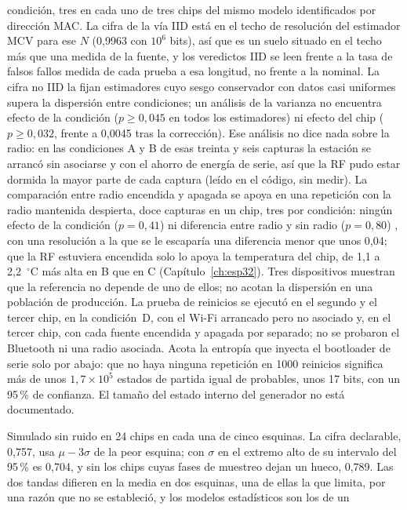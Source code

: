 \begin{description}
condición, tres en cada uno de tres chips del mismo modelo identificados por dirección
MAC. La
cifra de la vía IID está en el techo de resolución del estimador MCV para
ese $N$ (0,9963 con $10^6$ bits), así que es un suelo situado en el techo
más que una medida de la fuente, y los veredictos IID se leen frente a la
tasa de falsos fallos medida de cada prueba a esa longitud, no frente a la
nominal. La cifra no IID la fijan estimadores cuyo sesgo conservador con
datos casi uniformes supera la dispersión entre condiciones; un análisis
de la varianza no encuentra efecto de la condición ($p \ge 0{,}045$ en
todos los estimadores) ni efecto del chip ($p \ge 0{,}032$, frente a
0,0045 tras la corrección). Ese análisis no dice nada sobre la radio: en
las condiciones A y B de esas treinta y seis capturas la estación se
arrancó sin asociarse y con el ahorro de energía de serie, así que la RF
pudo estar dormida la mayor parte de cada captura (leído en el código,
sin medir). La comparación entre radio encendida y apagada se apoya en
una repetición con la radio mantenida despierta, doce capturas en un
chip, tres por condición: ningún efecto de la condición ($p = 0{,}41$)
ni diferencia entre radio y sin radio ($p = 0{,}80$) \meas{}, con una
resolución a la que se le escaparía una diferencia menor que unos 0,04;
que la RF estuviera encendida solo lo apoya la temperatura del chip, de
1,1 a 2,2~$^\circ$C más alta en B que en C (Capítulo~\ref{ch:esp32}).
Tres dispositivos muestran que la referencia
no depende de uno de ellos; no acotan la dispersión en una población de
producción. La prueba de reinicios se ejecutó en el segundo y el tercer
chip, en la
condición~D, con el Wi-Fi arrancado pero no asociado y, en el tercer
chip, con cada fuente encendida y apagada por separado; no se probaron
el Bluetooth ni una radio asociada. Acota la entropía que inyecta el
bootloader de serie solo por abajo: que no haya ninguna repetición en 1000
reinicios significa más de unos $1{,}7\times10^5$ estados de partida igual
de probables, unos 17 bits, con un 95\,\% de confianza. El tamaño del
estado interno del generador no está documentado.
\item[Sesgo del biestable de muestreo.] Simulado sin ruido \simu{} en 24
chips en cada una de cinco esquinas. La cifra declarable, 0,757, usa
$\mu - 3\sigma$ de la peor esquina; con $\sigma$ en el extremo alto de su
intervalo del 95\,\% es 0,704, y sin los chips cuyas fases de muestreo
dejan un hueco, 0,789. Las dos tandas difieren en la media en dos
esquinas, una de ellas la que limita, por
una razón que no se estableció, y los modelos estadísticos son los de un

\end{description}

